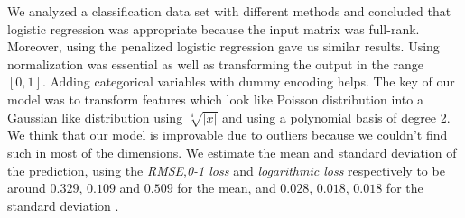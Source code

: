\documentclass{article} %
\begin{document}
We analyzed a classification data set with different methods and concluded that logistic regression was appropriate because the input matrix was full-rank. Moreover, using the penalized logistic regression gave us similar results. Using normalization was essential as well as transforming the output in the range $[0,1]$. Adding categorical variables with dummy encoding helps. The key of our model was to transform features which look like Poisson distribution into a Gaussian like distribution using $\sqrt[4]{|x|}$ and using a polynomial basis of degree 2. We think that our model is improvable due to outliers because we couldn't find such in most of the dimensions. We estimate the mean and standard deviation of the prediction, using the \textit{RMSE},\textit{0-1 loss} and \textit{logarithmic loss} respectively to be around $0.329$, $0.109$ and $0.509$ for the mean, and $0.028$, $0.018$, $0.018$ for the standard deviation .
\end{document}
